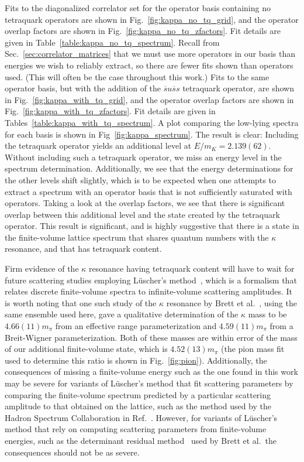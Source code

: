 Fits to the diagonalized correlator set for the operator basis containing no tetraquark operators are shown in Fig.~\ref{fig:kappa_no_tq_grid}, and the operator overlap factors are shown in Fig.~\ref{fig:kappa_no_tq_zfactors}. Fit details are given in Table~\ref{table:kappa_no_tq_spectrum}. Recall from Sec.~\ref{sec:correlator_matrices} that we must use more operators in our basis than energies we wish to reliably extract, so there are fewer fits shown than operators used. (This will often be the case throughout this work.) Fits to the same operator basis, but with the addition of the $\overline s u \overline s s$ tetraquark operator, are shown in Fig.~\ref{fig:kappa_with_tq_grid}, and the operator overlap factors are shown in Fig.~\ref{fig:kappa_with_tq_zfactors}. Fit details are given in Tables~\ref{table:kappa_with_tq_spectrum}. A plot comparing the low-lying spectra for each basis is shown in Fig~\ref{fig:kappa_spectrum}. The result is clear: Including the tetraquark operator yields an additional level at $E/m_K = 2.139(62)$. Without including such a tetraquark operator, we miss an energy level in the spectrum determination. Additionally, we see that the energy determinations for the other levels shift slightly, which is to be expected when one attempts to extract a spectrum with an operator basis that is not sufficiently saturated with operators. Taking a look at the overlap factors, we see that there is significant overlap between this additional level and the state created by the tetraquark operator. This result is significant, and is highly suggestive that there is a state in the finite-volume lattice spectrum that shares quantum numbers with the $\kappa$ resonance, and that has tetraquark content.

Firm evidence of the $\kappa$ resonance having tetraquark content will have to wait for future scattering studies employing L\"uscher's method~\cite{Luscher:1990ck}, which is a formalism that relates discrete finite-volume spectra to infinite-volume scattering amplitudes. It is worth noting that one such study of the $\kappa$ resonance by Brett et al.~\cite{Brett:2018jqw}, using the same ensemble used here, gave a qualitative determination of the $\kappa$ mass to be $4.66(11)m_\pi$ from an effective range parameterization and $4.59(11)m_\pi$ from  a Breit-Wigner parameterization. Both of these masses are within error of the mass of our additional finite-volume state, which is $4.52(13)m_\pi$ (the pion mass fit used to determine this ratio is shown in Fig.~\ref{fig:pion}). Additionally, the consequences of missing a finite-volume energy such as the one found in this work may be severe for variants of L\"uscher's method that fit scattering parameters by comparing the finite-volume spectrum predicted by a particular scattering amplitude to that obtained on the lattice, such as the method used by the Hadron Spectrum Collaboration in Ref.~\cite{Wilson:2015dqa}. However, for variants of L\"uscher's method that rely on computing scattering parameters from finite-volume energies, such as the determinant residual method~\cite{Morningstar:2017spu} used by Brett et al.\, the consequences should not be as severe.

